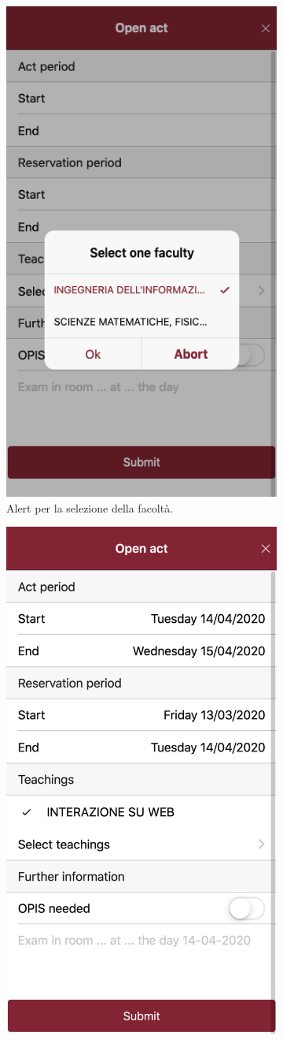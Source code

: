 \documentclass[Lau, oneside, noexaminfo]{sapthesis}%
\begin{document}
\begin{figure}[H]
	\begin{subfigure}{0.6\textwidth}
	  \centering
	  \includegraphics[width=0.5\linewidth]{ui-iterations/ii/select-faculty}  
	  \caption{Alert per la selezione della facoltà.}
	\end{subfigure}
	\begin{subfigure}{0.6\textwidth}
	  \centering
	  \includegraphics[width=0.5\linewidth]{ui-iterations/ii/form}  

\end{subfigure}
\end{figure}
\end{document}
